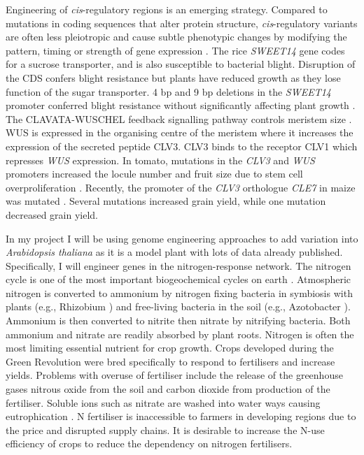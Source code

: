 \documentclass[../main.tex]{subfiles}
\begin{document}
Engineering of \textit{cis}\hyp{}regulatory regions is an emerging strategy.
Compared to mutations in coding sequences that alter protein structure, \textit{cis}\hyp{}regulatory variants are often less pleiotropic and cause subtle phenotypic changes by modifying the pattern, timing or strength of gene expression \autocite{wittkoppCisregulatoryElementsMolecular2012}.
The rice \textit{SWEET14} gene codes for a sucrose transporter, and is also susceptible to bacterial blight.
Disruption of the CDS confers blight resistance but plants have reduced growth as they lose function of the sugar transporter.
4 bp and 9 bp deletions in the \textit{SWEET14} promoter conferred blight resistance without significantly affecting plant growth \autocite{liHighefficiencyTALENbasedGene2012}.
The CLAVATA-WUSCHEL feedback signalling pathway controls meristem size \autocite{somssichCLAVATAWUSCHELSignalingShoot2016}.
WUS is expressed in the organising centre of the meristem where it increases the expression of the secreted peptide CLV3.
CLV3 binds to the receptor CLV1 which represses \textit{WUS} expression.
In tomato, mutations in the \textit{CLV3} and \textit{WUS} promoters increased the locule number and fruit size due to stem cell overproliferation \autocite{rodriguez-lealEngineeringQuantitativeTrait2017}.
Recently, the promoter of the \textit{CLV3} orthologue \textit{CLE7} in maize was mutated \autocite{liuEnhancingGrainyieldrelatedTraits2021}.
Several mutations increased grain yield, while one mutation decreased grain yield.

In my project I will be using genome engineering approaches to add variation into \textit{Arabidopsis thaliana} as it is a model plant with lots of data already published.
Specifically, I will engineer genes in the nitrogen\hyp{}response network.
The nitrogen cycle is one of the most important biogeochemical cycles on earth \autocite{lehnertReversingNitrogenFixation2018}.
Atmospheric nitrogen is converted to ammonium by nitrogen fixing bacteria in symbiosis with plants (e.g., Rhizobium \autocite{molingEvolutionRhizobiumNodulation2015}) and free\hyp{}living bacteria in the soil (e.g., Azotobacter \autocite{bhattacharyyaPlantGrowthpromotingRhizobacteria2012}).
Ammonium is then converted to nitrite then nitrate by nitrifying bacteria.
Both ammonium and nitrate are readily absorbed by plant roots.
Nitrogen is often the most limiting essential nutrient for crop growth.
Crops developed during the Green Revolution were bred specifically to respond to fertilisers and increase yields.
Problems with overuse of fertiliser include the release of the greenhouse gases nitrous oxide from the soil \autocite{zumftCellBiologyMolecular1997} and carbon dioxide from production of the fertiliser.
Soluble ions such as nitrate are washed into water ways causing eutrophication \autocite{gallowayChronologyHumanUnderstanding2013}.
N fertiliser is inaccessible to farmers in developing regions due to the price and disrupted supply chains.
It is desirable to increase the N\hyp{}use efficiency of crops to reduce the dependency on nitrogen fertilisers.
\end{document}

